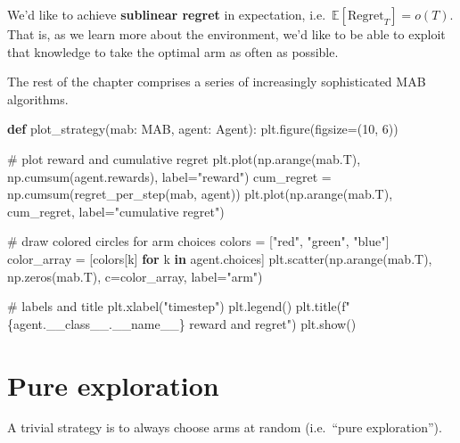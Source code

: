\documentclass[
  letterpaper,
  DIV=11,
  numbers=noendperiod]{scrreprt}
\newenvironment{Shaded}{\begin{snugshade}}{\end{snugshade}}
\newcommand{\CommentTok}[1]{\textcolor[rgb]{0.37,0.37,0.37}{#1}}
\newcommand{\ControlFlowTok}[1]{\textcolor[rgb]{0.00,0.23,0.31}{\textbf{#1}}}
\newcommand{\DecValTok}[1]{\textcolor[rgb]{0.68,0.00,0.00}{#1}}
\newcommand{\KeywordTok}[1]{\textcolor[rgb]{0.00,0.23,0.31}{\textbf{#1}}}
\newcommand{\NormalTok}[1]{\textcolor[rgb]{0.00,0.23,0.31}{#1}}
\newcommand{\OperatorTok}[1]{\textcolor[rgb]{0.37,0.37,0.37}{#1}}
\newcommand{\SpecialCharTok}[1]{\textcolor[rgb]{0.37,0.37,0.37}{#1}}
\newcommand{\SpecialStringTok}[1]{\textcolor[rgb]{0.13,0.47,0.30}{#1}}
\newcommand{\StringTok}[1]{\textcolor[rgb]{0.13,0.47,0.30}{#1}}
\newcommand{\VariableTok}[1]{\textcolor[rgb]{0.07,0.07,0.07}{#1}}
\theoremstyle{plain}
\theoremstyle{plain}
\theoremstyle{definition}
\theoremstyle{definition}
\theoremstyle{remark}
\begin{document}
We'd like to achieve \textbf{sublinear regret} in expectation,
i.e.~\(\mathbb{E}[\text{Regret}_T] = o(T)\). That is, as we learn more
about the environment, we'd like to be able to exploit that knowledge to
take the optimal arm as often as possible.

The rest of the chapter comprises a series of increasingly sophisticated
MAB algorithms.

\begin{Shaded}
\begin{Highlighting}[]
\KeywordTok{def}\NormalTok{ plot\_strategy(mab: MAB, agent: Agent):}
\NormalTok{    plt.figure(figsize}\OperatorTok{=}\NormalTok{(}\DecValTok{10}\NormalTok{, }\DecValTok{6}\NormalTok{))}

    \CommentTok{\# plot reward and cumulative regret}
\NormalTok{    plt.plot(np.arange(mab.T), np.cumsum(agent.rewards), label}\OperatorTok{=}\StringTok{"reward"}\NormalTok{)}
\NormalTok{    cum\_regret }\OperatorTok{=}\NormalTok{ np.cumsum(regret\_per\_step(mab, agent))}
\NormalTok{    plt.plot(np.arange(mab.T), cum\_regret, label}\OperatorTok{=}\StringTok{"cumulative regret"}\NormalTok{)}

    \CommentTok{\# draw colored circles for arm choices}
\NormalTok{    colors }\OperatorTok{=}\NormalTok{ [}\StringTok{"red"}\NormalTok{, }\StringTok{"green"}\NormalTok{, }\StringTok{"blue"}\NormalTok{]}
\NormalTok{    color\_array }\OperatorTok{=}\NormalTok{ [colors[k] }\ControlFlowTok{for}\NormalTok{ k }\KeywordTok{in}\NormalTok{ agent.choices]}
\NormalTok{    plt.scatter(np.arange(mab.T), np.zeros(mab.T), c}\OperatorTok{=}\NormalTok{color\_array, label}\OperatorTok{=}\StringTok{"arm"}\NormalTok{)}

    \CommentTok{\# labels and title}
\NormalTok{    plt.xlabel(}\StringTok{"timestep"}\NormalTok{)}
\NormalTok{    plt.legend()}
\NormalTok{    plt.title(}\SpecialStringTok{f"}\SpecialCharTok{\{}\NormalTok{agent}\SpecialCharTok{.}\NormalTok{\_\_class\_\_}\SpecialCharTok{.}\VariableTok{\_\_name\_\_}\SpecialCharTok{\}}\SpecialStringTok{ reward and regret"}\NormalTok{)}
\NormalTok{    plt.show()}
\end{Highlighting}
\end{Shaded}

\section{Pure exploration}\label{sec-pure_exploration}

A trivial strategy is to always choose arms at random (i.e.~``pure
exploration'').
\end{document}
